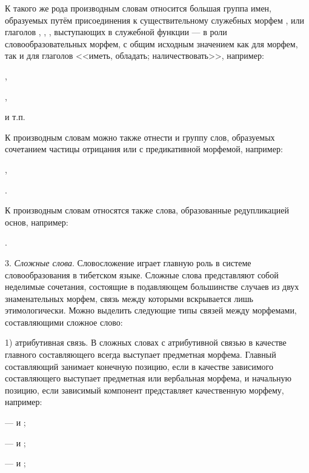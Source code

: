 К такого же рода производным словам относится большая группа имен, образуемых путём присоединения к существительному служебных морфем ,  или глаголов , , , выступающих в служебной функции --- в роли словообразовательных морфем, с общим исходным значением как для морфем, так и для глаголов <<иметь, обладать; наличествовать>>, например:
\begin{prfsample}
    \item {},
    \item {},
    \item {}
\end{prfsample}
и т.п.

К производным словам можно также отнести и группу слов, образуемых сочетанием частицы отрицания  или  с предикативной морфемой, например:
\begin{prfsample}
    \item {},
    \item {}.
\end{prfsample}

К производным словам относятся также слова, образованные редупликацией основ, например:
\begin{prfsample}
    \item {}.
\end{prfsample}

3. \emph{Сложные слова}. Словосложение играет главную роль в системе словообразования в тибетском языке. Сложные слова представляют собой неделимые сочетания, состоящие в подавляющем большинстве случаев из двух знаменательных морфем, связь между которыми вскрывается лишь этимологически. Можно выделить следующие типы связей между морфемами, составляющими сложное слово:

1) атрибутивная связь. В сложных словах с атрибутивной связью в качестве главного составляющего всегда выступает предметная морфема. Главный составляющий занимает конечную позицию, если в качестве зависимого составляющего выступает предметная или вербальная морфема, и начальную позицию, если зависимый компонент представляет качественную морфему, например: 
\begin{prfsample}
    \item {} ---  и ;
    \item {} ---  и ;
    \item {} ---  и ;
\end{prfsample}

